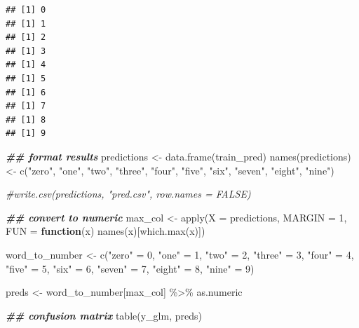 \documentclass[
]{book}
\newenvironment{Shaded}{\begin{snugshade}}{\end{snugshade}}
\newcommand{\AttributeTok}[1]{\textcolor[rgb]{0.77,0.63,0.00}{#1}}
\newcommand{\CommentTok}[1]{\textcolor[rgb]{0.56,0.35,0.01}{\textit{#1}}}
\newcommand{\ControlFlowTok}[1]{\textcolor[rgb]{0.13,0.29,0.53}{\textbf{#1}}}
\newcommand{\DecValTok}[1]{\textcolor[rgb]{0.00,0.00,0.81}{#1}}
\newcommand{\DocumentationTok}[1]{\textcolor[rgb]{0.56,0.35,0.01}{\textbf{\textit{#1}}}}
\newcommand{\FunctionTok}[1]{\textcolor[rgb]{0.00,0.00,0.00}{#1}}
\newcommand{\NormalTok}[1]{#1}
\newcommand{\OtherTok}[1]{\textcolor[rgb]{0.56,0.35,0.01}{#1}}
\newcommand{\SpecialCharTok}[1]{\textcolor[rgb]{0.00,0.00,0.00}{#1}}
\newcommand{\StringTok}[1]{\textcolor[rgb]{0.31,0.60,0.02}{#1}}
\begin{document}
\begin{verbatim}
## [1] 0
## [1] 1
## [1] 2
## [1] 3
## [1] 4
## [1] 5
## [1] 6
## [1] 7
## [1] 8
## [1] 9
\end{verbatim}

\begin{Shaded}
\begin{Highlighting}[]
\DocumentationTok{\#\# format results}
\NormalTok{predictions }\OtherTok{\textless{}{-}} \FunctionTok{data.frame}\NormalTok{(train\_pred)}
\FunctionTok{names}\NormalTok{(predictions) }\OtherTok{\textless{}{-}} \FunctionTok{c}\NormalTok{(}\StringTok{"zero"}\NormalTok{,}
                        \StringTok{"one"}\NormalTok{,}
                        \StringTok{"two"}\NormalTok{,}
                        \StringTok{"three"}\NormalTok{,}
                        \StringTok{"four"}\NormalTok{,}
                        \StringTok{"five"}\NormalTok{,}
                        \StringTok{"six"}\NormalTok{,}
                        \StringTok{"seven"}\NormalTok{,}
                        \StringTok{"eight"}\NormalTok{,}
                        \StringTok{"nine"}\NormalTok{)}

\CommentTok{\#write.csv(predictions, "pred.csv", row.names = FALSE)}

\DocumentationTok{\#\# convert to numeric}
\NormalTok{max\_col }\OtherTok{\textless{}{-}} \FunctionTok{apply}\NormalTok{(}\AttributeTok{X =}\NormalTok{ predictions,}
                 \AttributeTok{MARGIN =} \DecValTok{1}\NormalTok{,}
                 \AttributeTok{FUN =} \ControlFlowTok{function}\NormalTok{(x) }\FunctionTok{names}\NormalTok{(x)[}\FunctionTok{which.max}\NormalTok{(x)])}

\NormalTok{word\_to\_number }\OtherTok{\textless{}{-}} \FunctionTok{c}\NormalTok{(}\StringTok{"zero"} \OtherTok{=} \DecValTok{0}\NormalTok{,}
                    \StringTok{"one"} \OtherTok{=} \DecValTok{1}\NormalTok{,}
                    \StringTok{"two"} \OtherTok{=} \DecValTok{2}\NormalTok{,}
                    \StringTok{"three"} \OtherTok{=} \DecValTok{3}\NormalTok{,}
                    \StringTok{"four"} \OtherTok{=} \DecValTok{4}\NormalTok{,}
                    \StringTok{"five"} \OtherTok{=} \DecValTok{5}\NormalTok{,}
                    \StringTok{"six"} \OtherTok{=} \DecValTok{6}\NormalTok{,}
                    \StringTok{"seven"} \OtherTok{=} \DecValTok{7}\NormalTok{,}
                    \StringTok{"eight"} \OtherTok{=} \DecValTok{8}\NormalTok{,}
                    \StringTok{"nine"} \OtherTok{=} \DecValTok{9}\NormalTok{)}

\NormalTok{preds }\OtherTok{\textless{}{-}}\NormalTok{ word\_to\_number[max\_col] }\SpecialCharTok{\%\textgreater{}\%}\NormalTok{ as.numeric}

\DocumentationTok{\#\# confusion matrix}
\FunctionTok{table}\NormalTok{(y\_glm, preds)}
\end{Highlighting}
\end{Shaded}
\end{document}
